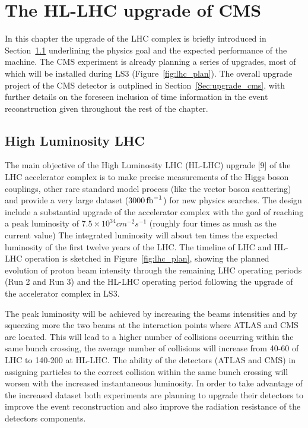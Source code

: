 \providecommand{\sixbysix}{\ensuremath{6\times 6\mathrm{~cm}^{2}}\xspace}
\providecommand{\threebythree}{\ensuremath{3\times 3\mathrm{~cm}^{2}}\xspace}
\providecommand{\twobytwo}{\ensuremath{2\times 2\mathrm{~cm}^{2}}\xspace}
\providecommand{\onebyone}{\ensuremath{1\times 1\mathrm{~cm}^{2}}\xspace}
\providecommand{\relChIso}{\ensuremath{Ch_{iso}/p_T^{muon}}}

\chapter{The HL-LHC upgrade of CMS}
\label{chapter:cms_upgrade}

In this chapter the upgrade of the LHC complex is briefly introduced in Section~\ref{upgrade_lhc}
underlining the physics goal and the expected performance of the machine. The CMS experiment is already planning
a series of upgrades, most of which will be installed during LS3 (Figure~\ref{fig:lhc_plan}).
The overall upgrade project of the CMS detector is outplined in Section~\ref{Sec:upgrade_cms}, with further details on the
foreseen inclusion of time information in the event reconstruction given throughout the rest of the chapter.

\section{High Luminosity LHC}
\label{upgrade_lhc}

The main objective of the High Luminosity LHC (HL-LHC) upgrade [9] of the LHC accelerator complex
is to make precise measurements of the Higgs boson couplings, other rare standard model process (like the vector boson scattering)
and provide a very large dataset ($3000\mathrm{\,fb}^{-1}$) for new physics searches.
The design include a substantial upgrade of the accelerator complex with the goal of reaching
a peak luminosity of $7.5\times10^{34} cm^{-2}s^{-1}$ (roughly four times as mush as the current value)
The integrated luminosity will about ten times the expected luminosity of the first twelve
years of the LHC.
The timeline of LHC and HL-LHC operation is sketched in Figure~\ref{fig:lhc_plan}, showing the planned
evolution of proton beam intensity through the remaining LHC operating periods (Run 2 and Run 3)
and the HL-LHC operating period following the upgrade of the accelerator complex in LS3.

The peak luminosity will be achieved by increasing the beams intensities and by squeezing more the two beams at the
interaction points where ATLAS and CMS are located.
This will lead to a higher number of collisions occurring within the same bunch crossing, the
average number of collisions will increase from 40-60 of LHC to 140-200 at HL-LHC.
The ability of the detectors (ATLAS and CMS) in assigning particles to the correct collision within the same bunch crossing
will worsen with the increased instantaneous luminosity. In order to take advantage of the increased dataset
both experiments are planning to upgrade their detectors to improve the event reconstruction and also improve
the radiation resistance of the detectors components.


